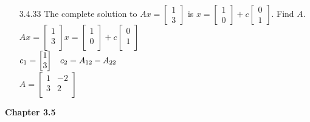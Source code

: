\documentclass[10pt,twoside,reqno]{article}
\begin{document}
\begin{enumerate}
\item[3.4.33] The complete solution to $Ax = \left[\begin{smallmatrix} 1\\ 3 \end{smallmatrix} \right]$ is $x = \left[\begin{smallmatrix} 1\\ 0 \end{smallmatrix} \right] + c \left[\begin{smallmatrix} 0\\ 1 \end{smallmatrix} \right]$. Find $A$.\\
 \vspace{3mm}
$
$$
Ax =
\begin{bmatrix}
1\\
3\\
\end{bmatrix}
x =
\begin{bmatrix}
1\\
0\\
\end{bmatrix}
+ c
\begin{bmatrix}
0\\
1\\
\end{bmatrix}
$$
$\\
$
$$
c_1 =
\begin{bmatrix}
1\\
3\\
\end{bmatrix}
\hspace{3mm}
c_2 = A_{12} - A_{22}
$$
$\\
$
$$
A = 
\begin{bmatrix}
1&-2\\
3&2\\
\end{bmatrix}
$$
$
\vspace{3mm}
\end{enumerate}
\vspace{5mm}
\textbf{Chapter 3.5}
\end{document}
